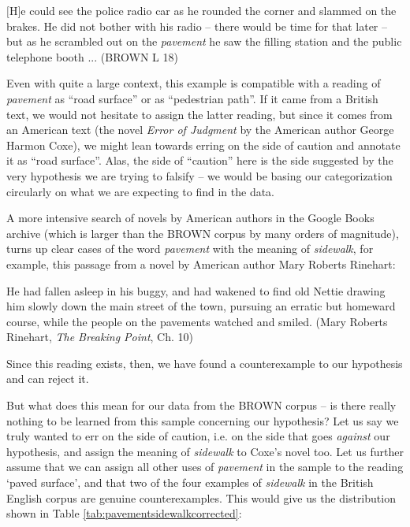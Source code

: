 \begin{exe}
\ex $[$H$]$e could see the police radio car as he rounded the corner and slammed on the brakes. He did not bother with his radio -- there would be time for that later -- but as he scrambled out on the \textit{pavement} he saw the filling station and the public telephone booth ... (BROWN L 18)
\label{ex:brownpavement}
\end{exe}

Even with quite a large context, this example is compatible with a reading of \textit{pavement} as ``road surface'' or as ``pedestrian path''. If it came from a British text, we would not hesitate to assign the latter reading, but since it comes from an American text (the novel \textit{Error of Judgment} by the American author George Harmon Coxe), we might lean towards erring on the side of caution and annotate it as ``road surface''. Alas, the side of ``caution'' here is the side suggested by the very hypothesis we are trying to falsify -- we would be basing our categorization circularly on what we are expecting to find in the data.

A more intensive search of novels by American authors in the Google Books archive (which is larger than the BROWN corpus by many orders of magnitude), turns up clear cases of the word \textit{pavement} with the meaning of \textit{sidewalk}, for example, this passage from a novel by American author Mary Roberts Rinehart:

\begin{exe}
\ex He had fallen asleep in his buggy, and had wakened to find old Nettie drawing him slowly down the main street of the town, pursuing an erratic but homeward course, while the people on the pavements watched and smiled. (Mary Roberts Rinehart, \textit{The Breaking Point}, Ch. 10)
\label{ex:rinehartpavement}
\end{exe}

Since this reading exists, then, we have found a counterexample to our hypothesis and can reject it.

But what does this mean for our data from the BROWN corpus -- is there really nothing to be learned from this sample concerning our hypothesis? Let us say we truly wanted to err on the side of caution, i.e. on the side that goes \textit{against} our hypothesis, and assign the meaning of \textit{sidewalk} to Coxe's novel too. Let us further assume that we can assign all other uses of \textit{pavement} in the sample to the reading `paved surface', and that two of the four examples of \textit{sidewalk} in the British English corpus are genuine counterexamples. This would give us the distribution shown in Table \ref{tab:pavementsidewalkcorrected}:

